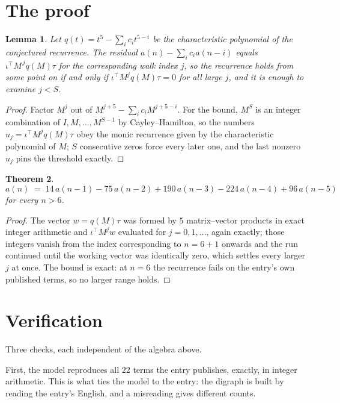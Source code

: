 \documentclass[11pt,a4paper]{article}
\theoremstyle{plain}
\newtheorem{theorem}{Theorem}
\newtheorem{lemma}[theorem]{Lemma}
\theoremstyle{definition}
\begin{document}
\section{The proof}

\begin{lemma}\label{lem:crit}
Let $q(t)=t^{5}-\sum_i c_it^{5-i}$ be the characteristic polynomial of the
conjectured recurrence. The residual $a(n)-\sum_ic_ia(n-i)$ equals
$\iota^{\!\top}M^{\,j}q(M)\tau$ for the corresponding walk index $j$, so the recurrence
holds from some point on if and only if $\iota^{\!\top}M^{j}q(M)\tau=0$ for all large $j$,
and it is enough to examine $j<S$.
\end{lemma}

\begin{proof}
Factor $M^{j}$ out of $M^{j+5}-\sum_ic_iM^{j+5-i}$. For the bound, $M^{S}$
is an integer combination of $I,M,\dots,M^{S-1}$ by Cayley--Hamilton, so the numbers
$u_j=\iota^{\!\top}M^{j}q(M)\tau$ obey the monic recurrence given by the characteristic
polynomial of $M$; $S$ consecutive zeros force every later one, and the last nonzero $u_j$
pins the threshold exactly.
\end{proof}

\begin{theorem}
\[
a(n)\;=\;14\,a(n-1) - 75\,a(n-2) + 190\,a(n-3) - 224\,a(n-4) + 96\,a(n-5)
\]
for every $n>6$.
\end{theorem}

\begin{proof}
The vector $w=q(M)\tau$ was formed by $5$ matrix--vector products in exact integer
arithmetic and $\iota^{\!\top}M^{j}w$ evaluated for $j=0,1,\dots$, again exactly; those
integers vanish from the index corresponding to $n=6+1$ onwards and the run continued
until the working vector was identically zero, which settles every larger $j$ at once. The bound is exact: at $n=6$ the recurrence fails on the entry's own published terms, so no larger range holds.
\end{proof}

\section{Verification}

Three checks, each independent of the algebra above.

First, the model reproduces all $22$ terms the entry publishes, exactly, in integer
arithmetic. This is what ties the model to the entry: the digraph is built by reading the
entry's English, and a misreading gives different counts.
\end{document}
